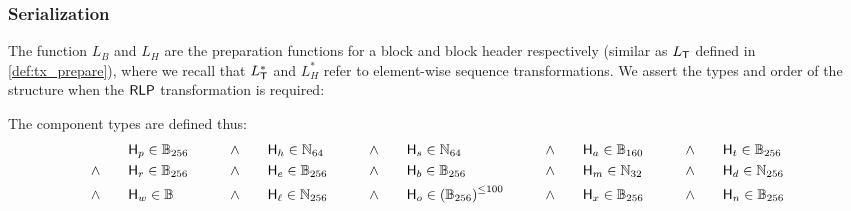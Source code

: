 \subsubsection{Serialization}

The function $L_B$ and $L_H$ are the preparation functions for a block and block header respectively (similar as $L_{\textsf{T}}$ defined in \cref{def:tx_prepare}),
where we recall that $L_{\textsf{T}}^*$ and $L_H^*$ refer to element-wise sequence transformations.
We assert the types and order of the structure when the $\mathsf{RLP}$ transformation is required:

The component types are defined thus: 
\begin{align}
	& \head_p \in \B_{256} 
	\qquad &\land \qquad &\head_h\in \N_{64}
	\qquad &\land \qquad &\head_s\in \N_{64}
	\qquad &\land \qquad &\head_a\in \B_{160}
	\qquad &\land \qquad &\head_t\in \B_{256}
	\notag\\
	\land \qquad &\head_r\in \B_{256}
	\qquad & \land \qquad &\head_e\in \B_{256}
	\qquad &\land \qquad &\head_b\in \B_{256} 
	\qquad &\land \qquad &\head_m\in \N_{32}	
	\qquad &\land \qquad &\head_d\in \N_{256}	
	\notag\\
	\land \qquad &\head_w\in \B
	\qquad &\land \qquad &\head_\ell\in \N_{256}	%
	\qquad &\land \qquad &\head_{o} \in\left(\B_{256}\right)^{\le \numberofommers}
	\qquad &\land \qquad &\head_x\in \B_{256}
	\qquad &\land \qquad &\head_n\in \B_{256}
\end{align}

